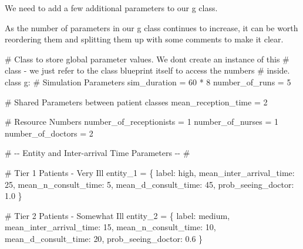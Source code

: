 \documentclass[
  letterpaper,
  DIV=11,
  numbers=noendperiod]{scrreprt}
\newenvironment{Shaded}{}{}
\newcommand{\CommentTok}[1]{\textcolor[rgb]{0.42,0.45,0.49}{#1}}
\newcommand{\DecValTok}[1]{\textcolor[rgb]{0.00,0.36,0.77}{#1}}
\newcommand{\FloatTok}[1]{\textcolor[rgb]{0.00,0.36,0.77}{#1}}
\newcommand{\KeywordTok}[1]{\textcolor[rgb]{0.84,0.23,0.29}{#1}}
\newcommand{\NormalTok}[1]{\textcolor[rgb]{0.14,0.16,0.18}{#1}}
\newcommand{\OperatorTok}[1]{\textcolor[rgb]{0.14,0.16,0.18}{#1}}
\newcommand{\StringTok}[1]{\textcolor[rgb]{0.01,0.18,0.38}{#1}}
\begin{document}
We need to add a few additional parameters to our g class.

As the number of parameters in our g class continues to increase, it can
be worth reordering them and splitting them up with some comments to
make it clear.

\begin{Shaded}
\begin{Highlighting}[]
\CommentTok{\# Class to store global parameter values.  We don\textquotesingle{}t create an instance of this}
\CommentTok{\# class {-} we just refer to the class blueprint itself to access the numbers}
\CommentTok{\# inside.}
\KeywordTok{class}\NormalTok{ g:}
    \CommentTok{\# Simulation Parameters}
\NormalTok{    sim\_duration }\OperatorTok{=} \DecValTok{60} \OperatorTok{*} \DecValTok{8}
\NormalTok{    number\_of\_runs }\OperatorTok{=} \DecValTok{5}

    \CommentTok{\# Shared Parameters between patient classes}
\NormalTok{    mean\_reception\_time }\OperatorTok{=} \DecValTok{2}

    \CommentTok{\# Resource Numbers}
\NormalTok{    number\_of\_receptionists }\OperatorTok{=} \DecValTok{1}
\NormalTok{    number\_of\_nurses }\OperatorTok{=} \DecValTok{1}
\NormalTok{    number\_of\_doctors }\OperatorTok{=} \DecValTok{2}

    \CommentTok{\# {-}{-} Entity and Inter{-}arrival Time Parameters {-}{-} \#}

    \CommentTok{\# Tier 1 Patients {-} Very Ill}
\NormalTok{    entity\_1 }\OperatorTok{=}\NormalTok{ \{}
        \StringTok{\textquotesingle{}label\textquotesingle{}}\NormalTok{: }\StringTok{\textquotesingle{}high\textquotesingle{}}\NormalTok{,}
        \StringTok{\textquotesingle{}mean\_inter\_arrival\_time\textquotesingle{}}\NormalTok{: }\DecValTok{25}\NormalTok{,}
        \StringTok{\textquotesingle{}mean\_n\_consult\_time\textquotesingle{}}\NormalTok{: }\DecValTok{5}\NormalTok{,}
        \StringTok{\textquotesingle{}mean\_d\_consult\_time\textquotesingle{}}\NormalTok{: }\DecValTok{45}\NormalTok{,}
        \StringTok{\textquotesingle{}prob\_seeing\_doctor\textquotesingle{}}\NormalTok{: }\FloatTok{1.0}
\NormalTok{    \}}

    \CommentTok{\# Tier 2 Patients {-} Somewhat Ill}
\NormalTok{    entity\_2 }\OperatorTok{=}\NormalTok{ \{}
        \StringTok{\textquotesingle{}label\textquotesingle{}}\NormalTok{: }\StringTok{\textquotesingle{}medium\textquotesingle{}}\NormalTok{,}
        \StringTok{\textquotesingle{}mean\_inter\_arrival\_time\textquotesingle{}}\NormalTok{: }\DecValTok{15}\NormalTok{,}
        \StringTok{\textquotesingle{}mean\_n\_consult\_time\textquotesingle{}}\NormalTok{: }\DecValTok{10}\NormalTok{,}
        \StringTok{\textquotesingle{}mean\_d\_consult\_time\textquotesingle{}}\NormalTok{: }\DecValTok{20}\NormalTok{,}
        \StringTok{\textquotesingle{}prob\_seeing\_doctor\textquotesingle{}}\NormalTok{: }\FloatTok{0.6}
\NormalTok{    \}}


\end{Highlighting}
\end{Shaded}
\end{document}
